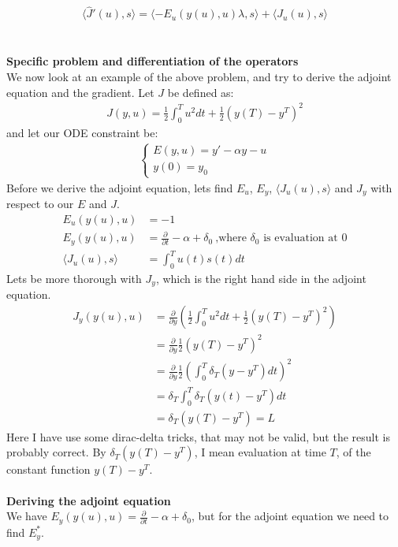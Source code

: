 \documentclass[11pt,a4paper]{report}
\begin{document}
\begin{gather}
\langle\hat{J}'(u),s\rangle=\langle -E_u(y(u),u)\lambda,s\rangle +\langle J_u(u),s\rangle
\end{gather} 
\\
\\
\textbf{Specific problem and differentiation of the operators}
\\
We now look at an example of the above problem, and try to derive the adjoint equation and the gradient. Let $J$ be defined as:
\begin{gather}
J(y,u) = \frac{1}{2}\int_0^Tu^2dt + \frac{1}{2}(y(T)-y^T)^2
\end{gather} 
and let our ODE constraint be:
\begin{align}
\left\{
     \begin{array}{lr}
       	E(y,u) = y'-\alpha y -u\\
       	   y(0)=y_0
     \end{array}
   \right.
\end{align}
Before we derive the adjoint equation, lets find $E_u$, $E_y$, $ \langle J_u(u),s\rangle$ and $J_y$ with respect to our $E$ and $J$.
\begin{align*}
E_u(y(u),u)&=-1 \\
E_y(y(u),u)&=\frac{\partial}{\partial t} - \alpha + \delta_0 \ \text{,where $\delta_0$ is evaluation at 0} \\
\langle J_u(u),s\rangle &= \int_0^T u(t)s(t) dt 
\end{align*}
Lets be more thorough with $J_y$, which is the right hand side in the adjoint equation.
\begin{align*}
J_y(y(u),u) &= \frac{\partial}{\partial y}(\frac{1}{2}\int_0^Tu^2dt + \frac{1}{2}(y(T)-y^T)^2) \\ &= \frac{\partial}{\partial y} \frac{1}{2}(y(T)-y^T)^2 \\
&= \frac{\partial}{\partial y}\frac{1}{2}(\int_0^T \delta_T(y-y^T)dt)^2 \\
&= \delta_T\int_0^T \delta_T(y(t)-y^T)dt \\
&= \delta_T(y(T)-y^T)=L
\end{align*}
Here I have use some dirac-delta tricks, that may not be valid, but the result is probably correct. By $\delta_T(y(T)-y^T)$, I mean evaluation at time $T$, of the constant function $y(T)-y^T$.
\\
\\
\textbf{Deriving the adjoint equation}
\\
We have $E_y(y(u),u)=\frac{\partial}{\partial t} - \alpha + \delta_0$, but for the adjoint equation we need to find $E_y^*$.
\end{document}
